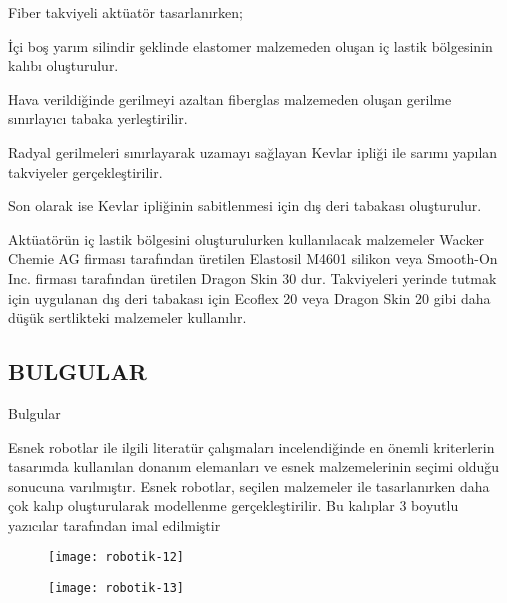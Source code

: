 \documentclass{beamer}
\begin{document}
\begin{frame}
\begin{block}{Fiber takviyeli aktüatör tasarlanırken;}
\item İçi boş yarım silindir şeklinde elastomer malzemeden oluşan iç lastik bölgesinin kalıbı oluşturulur.
\item Hava verildiğinde gerilmeyi azaltan fiberglas malzemeden oluşan gerilme sınırlayıcı tabaka yerleştirilir.
\item Radyal gerilmeleri sınırlayarak uzamayı sağlayan Kevlar ipliği ile sarımı yapılan takviyeler gerçekleştirilir.
\item  Son olarak ise Kevlar ipliğinin sabitlenmesi için dış deri tabakası oluşturulur.
\item Aktüatörün iç lastik bölgesini oluşturulurken kullanılacak malzemeler Wacker Chemie AG firması tarafından üretilen Elastosil M4601 silikon veya Smooth-On Inc. firması tarafından üretilen Dragon Skin 30 dur. Takviyeleri yerinde tutmak için uygulanan dış deri tabakası için Ecoflex 20 veya Dragon Skin 20 gibi daha düşük sertlikteki malzemeler kullanılır.
\end{block}
\end{frame}

\subsection{BULGULAR}

\begin{frame}{Bulgular}
\begin{block}
\item Esnek robotlar ile ilgili literatür çalışmaları incelendiğinde en önemli kriterlerin tasarımda kullanılan donanım elemanları ve esnek malzemelerinin seçimi olduğu sonucuna varılmıştır. Esnek robotlar, seçilen malzemeler ile tasarlanırken daha çok kalıp oluşturularak modellenme gerçekleştirilir. Bu kalıplar 3 boyutlu yazıcılar tarafından imal edilmiştir
\end{block}
\end{frame}

\begin{frame}
\begin{figure}[ht]
\centering
\texttt{[image: robotik-12]}
\caption{\label{Tablo-1}}
\end{figure}
\begin{figure}
\texttt{[image: robotik-13]}
\caption{\label{Tablo-1}}
\end{figure}
\end{frame}
\end{document}

